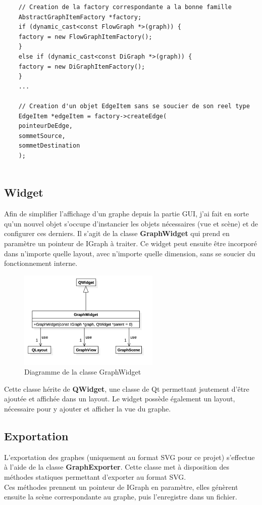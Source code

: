\documentclass[french]{article}
\begin{document}
	\begin{lstlisting}
	// Creation de la factory correspondante a la bonne famille
	AbstractGraphItemFactory *factory;
	if (dynamic_cast<const FlowGraph *>(graph)) {
	factory = new FlowGraphItemFactory();
	}
	else if (dynamic_cast<const DiGraph *>(graph)) {
	factory = new DiGraphItemFactory();
	}
	...
	
	// Creation d'un objet EdgeItem sans se soucier de son reel type
	EdgeItem *edgeItem = factory->createEdge(
	pointeurDeEdge,
	sommetSource,
	sommetDestination
	);
	
	\end{lstlisting}
	
	\pagebreak
	
	\subsection{Widget}
	Afin de simplifier l'affichage d'un graphe depuis la partie GUI, j'ai fait en sorte qu'un nouvel objet s'occupe d'instancier les objets nécessaires (vue et scène) et de configurer ces derniers. Il s'agit de la classe \textbf{GraphWidget} qui prend en paramètre un pointeur de IGraph à traiter. Ce widget peut ensuite être incorporé dans n'importe quelle layout, avec n'importe quelle dimension, sans se soucier du fonctionnement interne.
	
	\begin{figure}[H]
		\centering
		\includegraphics[width=0.6\textwidth]{Conception/visualization/graphwidget.png}
		\caption{Diagramme de la classe GraphWidget}
	\end{figure}
	
	Cette classe hérite de \textbf{QWidget}, une classe de Qt permettant jsutement d'être ajoutée et affichée dans un layout. Le widget possède également un layout, nécessaire pour y ajouter et afficher la vue du graphe.
	
	\subsection{Exportation}
	L'exportation des graphes (uniquement au format SVG pour ce projet) s'effectue à l'aide de la classe \textbf{GraphExporter}. Cette classe met à disposition des méthodes statiques permettant d'exporter au format SVG. \\
	Ces méthodes prennent un pointeur de IGraph en paramètre, elles génèrent ensuite la scène correspondante au graphe, puis l'enregistre dans un fichier.
	
\end{document}
